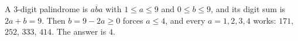 A $3$-digit palindrome is $\overline{aba}$ with $1\le a\le9$ and $0\le b\le9$, and its digit sum is $2a+b=9$. Then $b=9-2a\ge0$ forces $a\le4$, and every $a=1,2,3,4$ works: $171$, $252$, $333$, $414$. The answer is $\boxed{4}$.
